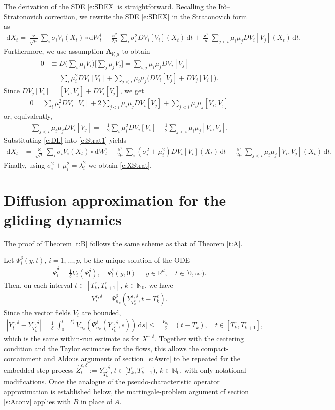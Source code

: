 \documentclass[10pt]{article}
\newcommand{\1}{1\!\!\!\;{\rm I}}
\theoremstyle{plain}
\theoremstyle{definition}
\newcommand{\e}{\varepsilon}
\newcommand{\ba}{\begin{equation}\begin{aligned}}
\newcommand{\ea}{\end{aligned}\end{equation}}
\newcommand{\di}{\mathrm{d}}
\newcommand{\bR}{\mathbb{R}}
\numberwithin{equation}{section}
\begin{document}
The derivation of the SDE \eqref{e:SDEX} is straightforward. Recalling the It\^o--Stratonovich correction, we rewrite the SDE
\eqref{e:SDEX} in the Stratonovich form as
\ba
\label{e:Strat1}
\di X_t= \frac{\varkappa}{\sqrt\mu}  \sum_{i} \sigma_{i} V_i(X_t)\circ \di W^i_t -
\frac{\varkappa^2}{2\mu} \sum_{i} \sigma^2_i  D V_i [ V_i](X_t)\,\di t+
\frac{\varkappa^2}{\mu} \sum_{j< i} \mu_i\mu_j  D V_i [ V_j](X_t)\,\di t.
\ea
Furthermore, we use assumption $\mathbf{A}_{V,\mu}$ to obtain
\ba
0&\equiv D\Big(\sum_i\mu_iV_i\Big)\Big[\sum_j\mu_j V_j \Big]=\sum_{i,j} \mu_i\mu_j  DV_i[V_j]\\
&=\sum_{i} \mu_i^2 DV_i[V_i] + \sum_{j<i} \mu_i\mu_j \Big(DV_i[V_j]+DV_j[V_i]\Big).
\ea
Since $DV_j[V_i]= [V_i,V_j] + DV_i[V_j]$, we get
\ba
0= \sum_{i}\mu_i^2 DV_i[V_i] + 2\sum_{j<i} \mu_i\mu_j  DV_i[V_j] + \sum_{j<i} \mu_i\mu_j  [V_i,V_j]
\ea
or, equivalently,
\ba
\label{e:DL}
\sum_{j<i} \mu_i\mu_j  DV_i[V_j] = -\frac12 \sum_{i}\mu_i^2 DV_i[V_i] -\frac12 \sum_{j<i} \mu_i\mu_j  [V_i,V_j].
\ea
Substituting \eqref{e:DL} into \eqref{e:Strat1} yields
\ba
\di X_t
&= \frac{\varkappa}{\sqrt\mu}  \sum_{i} \sigma_{i} V_i(X_t)\circ \di W^i_t -
\frac{\varkappa^2}{2\mu} \sum_{i} (\sigma^2_i+\mu_i^2)  D V_i [ V_i](X_t)\,\di t
-\frac{\varkappa^2}{2\mu}\sum_{j<i} \mu_i\mu_j  [V_i,V_j](X_t)\,\di t.
\ea
Finally, using $\sigma^2_i + \mu_i^2=\lambda^2_i$ we obtain \eqref{e:XStrat}.


\section{Diffusion approximation for the gliding dynamics\label{s:gliding}}

The proof of Theorem \ref{t:B} follows the same scheme as that of Theorem \ref{t:A}.

Let $\Psi_i^\delta(y,t)$, $i=1,\dots,p$, be the unique solution of the ODE
\ba
\label{e:Psi}
\dot \Psi_i^\delta=\frac{1}{\delta}V_i(\Psi^\delta_i),\quad \Psi_i^\delta(y,0)=y\in\bR^d,\quad t\in[0,\infty).
\ea
Then, on each interval $t\in[T^\e_k,T^\e_{k+1}]$, $k\in\mathbb N_0$, we have
\ba
Y^{\e,\delta}_t=\Psi_{n_k}^\delta(Y^{\e,\delta}_{T^\e_k},t-T_k^\e).
\ea
Since the vector fields $V_i$ are bounded,
\ba
|Y^{\e,\delta}_t - Y^{\e,\delta}_{T^\e_k}|=
\frac{1}{\delta} \Big|\int_{0}^{t -T^\e_k} V_{n_k}(\Psi^\delta_{n_k}(Y^{\e,\delta}_{T^\e_k} ,s  ))\,\di s  \Big|
\leq   \frac{\|V_{n_k}\|}{\delta}(t-T^\e_k),\quad t\in[T^\e_k,T^\e_{k+1}],
\ea
which is the same within-run estimate as for $X^{\e,\delta}$.
Together with the centering condition and the Taylor estimates for the flows,
this allows the compact-containment and Aldous arguments of section~\ref{s:Awrc} to be repeated for the embedded step process
$\widehat Z^{\e,\delta}_t:=Y^{\e,\delta}_{T_k^\e}$, $t\in [T_k^\e,T^\e_{k+1})$,
$k\in\mathbb N_0$, with only notational modifications.
Once the analogue of the pseudo-characteristic operator approximation
is established below, the martingale-problem argument of section \ref{s:Aconv} applies with $B$ in place of $A$.
\end{document}
